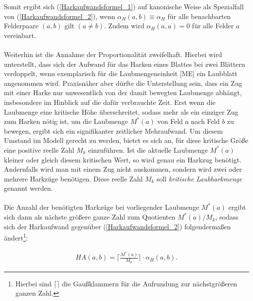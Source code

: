 \documentclass[fontsize=12pt,doubleside,openany,listof=totoc,listof=flat,listof=nochaptergap,numbers=noenddot]{scrbook}
\theoremstyle{style}
\begin{document}
\noindent Somit ergibt sich (\ref{Harkaufwandsformel_1}) auf kanonische Weise als Spezialfall von
(\ref{Harkaufwandsformel_2}), wenn $\alpha_H(a,b) \equiv  \alpha_H$ für alle benachbarten Felderpaare $(a,b)$ gilt $(a \neq b)$. Zudem wird $\alpha_H(a,a)=0$ für alle Felder $a$ vereinbart.
\\ \\
Weiterhin ist die Annahme der Proportionalität zweifelhaft. Hierbei wird 
unterstellt, dass sich der Aufwand für das Harken eines Blattes bei zwei 
Blättern verdoppelt, wenn exemplarisch für die Laubmengeneinheit [ME] ein 
Laubblatt angenommen wird. Praxisnäher aber dürfte die Unterstellung sein, 
dass ein Zug mit einer Harke nur unwesentlich von der damit bewegten 
Laubmenge abhängt, insbesondere im Hinblick auf die dafür verbrauchte Zeit. 
Erst wenn die Laubmenge eine kritische Höhe überschreitet, sodass mehr als 
ein einziger Zug zum Harken nötig ist, um die Laubmenge $M^*(a)$ von Feld $a$ 
nach Feld $b$ zu bewegen, ergibt sich ein signifikanter zeitlicher Mehraufwand. 
Um diesem Umstand im Modell gerecht zu werden, bietet es sich an, 
für diese kritische Größe eine positive reelle Zahl $M_k$ einzuführen. 
Ist die aktuelle Laubmenge $M^*(a)$ kleiner oder gleich diesem kritischen Wert, 
so wird genau ein Harkzug benötigt. Andernfalls wird man mit einem Zug 
nicht auskommen, sondern wird zwei oder mehrere Harkzüge benötigen. 
Diese reelle Zahl $M_k$ soll \textit{kritische Laubharkmenge}\label{kritische Laubharkmenge} genannt werden.
\\ \\
Die Anzahl der benötigten Harkzüge bei vorliegender Laubmenge $M^*(a)$ ergibt 
sich dann als nächste größere ganze Zahl zum Quotienten $M^*(a)/M_k$, sodass 
sich der Harkaufwand gegenüber (\ref{Harkaufwandsformel_2}) folgendermaßen ändert\footnote{Hierbei sind $\lceil \rceil$ die Gaußklammern für die Aufrundung zur nächstgrößeren ganzen Zahl.}:
			
\begin{align}
HA(a,b) = \Big\lceil \frac{M^*(a)}{M_k} \Big\rceil \cdot \alpha_H(a,b).\label{Harkaufwandsformel_3}
\end{align}		
						
\end{document}
